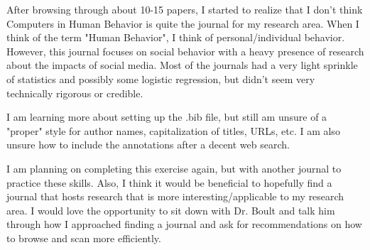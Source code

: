 \documentclass[a4paper]{article}
\begin{document}
After browsing through about 10-15 papers, I started to realize that I don't think Computers in Human Behavior is quite the journal for my research area. When I think of the term "Human Behavior", I think of personal/individual behavior. However, this journal focuses on social behavior with a heavy presence of research about the impacts of social media. Most of the journals had a very light sprinkle of statistics and possibly some logistic regression, but didn't seem very technically rigorous or credible.

I am learning more about setting up the .bib file, but still am unsure of a "proper" style for author names, capitalization of titles, URLs, etc. I am also unsure how to include the annotations after a decent web search. 

I am planning on completing this exercise again, but with another journal to practice these skills. Also, I think it would be beneficial to hopefully find a journal that hosts research that is more interesting/applicable to my research area. I would love the opportunity to sit down with Dr. Boult and talk him through how I approached finding a journal and ask for recommendations on how to browse and scan more efficiently.

\newpage


\nocite{*}
\end{document}
